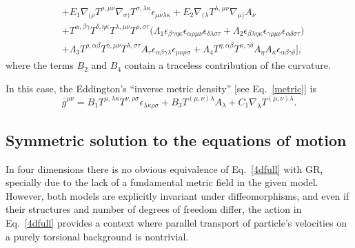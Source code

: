 \documentclass{ws-mpla}
\renewcommand{\(}{\left(}
\renewcommand{\)}{\right)}
\renewcommand{\[}{\left[}
\renewcommand{\]}{\right]}
\begin{document}
\begin{equation}
\begin{split}
        & +E_1\nabla_{(\rho} T^{\rho,\mu\nu}\nabla_{\sigma)} T^{\sigma,\lambda\kappa}\epsilon_{\mu\nu\lambda\kappa}
        +E_2\nabla_{(\lambda} T^{\lambda,\mu\nu}\nabla_{\mu)} A_\nu
        \\
        & +T^{\alpha,\beta\gamma}T^{\delta,\eta\kappa}T^{\lambda,\mu\nu}T^{\rho,\sigma\tau}
        \big(\Lambda_1\epsilon_{\beta\gamma\eta\kappa}\epsilon_{\alpha\rho\mu\nu}\epsilon_{\delta\lambda\sigma\tau}
        +\Lambda_2\epsilon_{\beta\lambda\eta\kappa}\epsilon_{\gamma\rho\mu\nu}\epsilon_{\alpha\delta\sigma\tau}\big) 
        \\
        & +\Lambda_3 T^{\rho,\alpha\beta}T^{\gamma,\mu\nu}T^{\lambda,\sigma\tau}A_\tau \epsilon_{\alpha\beta\gamma\lambda}\epsilon_{\mu\nu\rho\sigma}
        +\Lambda_4T^{\eta,\alpha\beta}T^{\kappa,\gamma\delta}A_\eta A_\kappa\epsilon_{\alpha\beta\gamma\delta}\Bigg],
    \end{split}
\end{equation}
where the terms $B_2$ and $B_4$  contain a traceless contribution of the curvature.

In this case, the Eddington's  ``inverse metric density'' [see Eq.~\eqref{metric}] is 
\begin{equation}
  \label{4dMetric}
  \bar{g}^{\mu\nu} = B_1 T^{\mu,\lambda\kappa}T^{\nu,\rho\sigma}\epsilon_{\lambda\kappa\rho\sigma} + B_3 T^{(\mu,\nu)\lambda}A_\lambda + C_1 {\nabla}_\lambda T^{(\mu,\nu)\lambda}.
\end{equation}


\subsection{Symmetric solution to the equations of motion}

In four dimensions there is no obvious equivalence of Eq.~\eqref{4dfull} with GR, specially due to the lack of a fundamental metric field in the given model. However, both models are explicitly invariant under diffeomorphisms, and even if their structures and number of degrees of freedom differ, the action in Eq.~\eqref{4dfull} provides a context where parallel transport of particle's velocities on a purely torsional background is nontrivial.
\end{document}
